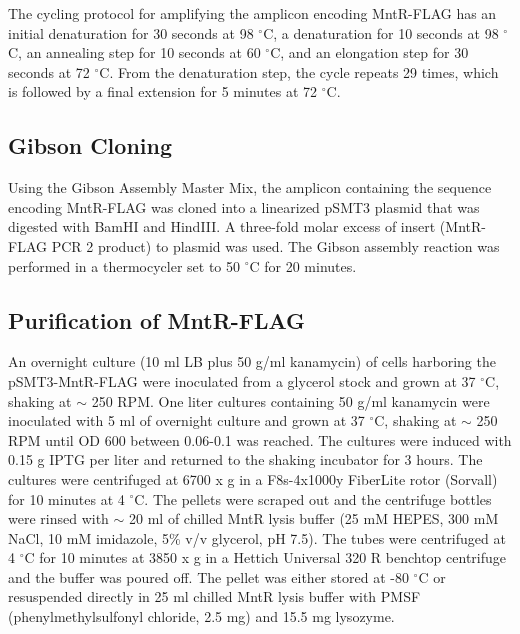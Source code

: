 \documentclass[12pt,twoside]{reedthesis}
\begin{document}
The cycling protocol for amplifying the amplicon encoding MntR-FLAG has an initial denaturation for 30 seconds at 98 $^{\circ}$C, a denaturation for 10 seconds at 98 $^{\circ}$C, an annealing step for 10 seconds at 60 $^{\circ}$C, and an elongation step for 30 seconds at 72 $^{\circ}$C. From the denaturation step, the cycle repeats 29 times, which is followed by a final extension for 5 minutes at 72 $^{\circ}$C. 
\subsection{Gibson Cloning}
Using the Gibson Assembly\textsuperscript{\textregistered} Master Mix, the amplicon containing the sequence encoding MntR-FLAG was cloned into a linearized pSMT3 plasmid that was digested with BamHI and HindIII. A three-fold molar excess of insert (MntR-FLAG PCR 2 product) to plasmid was used. The Gibson assembly reaction was performed in a thermocycler set to 50 $^\circ$C for 20 minutes. 

\subsection{Purification of MntR-FLAG}

An overnight culture (10 ml LB plus 50 \micro g/ml kanamycin) of cells harboring the pSMT3-MntR-FLAG were inoculated from a glycerol stock and grown at 37 $^\circ$C, shaking at $\sim$ 250 RPM. One liter cultures containing 50 \micro g/ml kanamycin were inoculated with 5 ml of overnight culture and grown at 37 $^\circ$C, shaking at $\sim$ 250 RPM until OD 600 between 0.06-0.1 was reached. The cultures were induced with 0.15 g IPTG per liter and returned to the shaking incubator for 3 hours. The cultures were centrifuged at 6700 x g in a F8s-4x1000y FiberLite\textsuperscript{\textregistered} rotor (Sorvall) for 10 minutes at 4 $^\circ$C. The pellets were scraped out and the centrifuge bottles were rinsed with $\sim$ 20 ml of chilled MntR lysis buffer (25 mM HEPES, 300 mM NaCl, 10 mM imidazole, 5\% v/v glycerol, pH 7.5). The tubes were centrifuged at 4 $^\circ$C for 10 minutes at 3850 x g in a Hettich Universal 320 R benchtop centrifuge and the buffer was poured off. The pellet was either stored at -80 $^\circ$C or resuspended directly in 25 ml chilled MntR lysis buffer with PMSF (phenylmethylsulfonyl chloride, 2.5 mg) and 15.5 mg lysozyme. 
\end{document}
